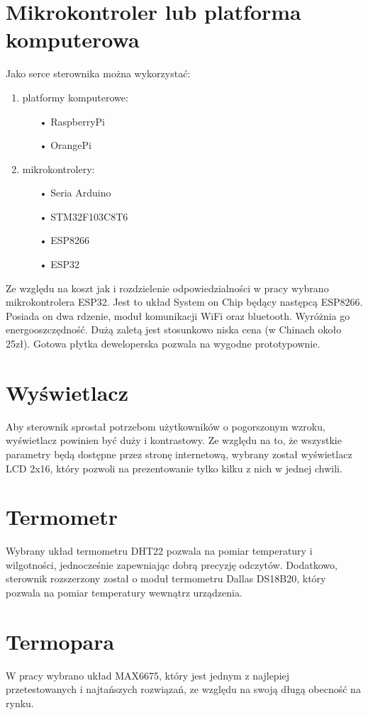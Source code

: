 \documentclass[11pt]{report}
\begin{document}
 \section{Mikrokontroler lub platforma komputerowa}
 Jako serce sterownika można wykorzystać:
 \begin{enumerate}
 \item platformy komputerowe:
 \begin{enumerate}
 \item[•] RaspberryPi
 \item[•] OrangePi
 \end{enumerate}
\item mikrokontrolery:
 \begin{enumerate}
 \item[•] Seria Arduino
 \item[•] STM32F103C8T6
 \item[•] ESP8266
 \item[•] ESP32
 \end{enumerate}
 \end{enumerate}
 Ze względu na koszt jak i rozdzielenie odpowiedzialności w pracy wybrano mikrokontrolera ESP32. Jest to układ System on Chip będący następcą ESP8266. Posiada on dwa rdzenie, moduł komunikacji WiFi oraz bluetooth. Wyróżnia go energooszczędność. Dużą zaletą jest stosunkowo niska cena (w Chinach około 25zł). Gotowa płytka deweloperska pozwala na wygodne prototypownie.
 
 \section{Wyświetlacz}
 Aby sterownik sprostał potrzebom użytkowników o pogorszonym wzroku, wyświetlacz powinien być duży i kontrastowy.
 Ze względu na to, że wszystkie parametry będą dostępne przez stronę internetową, wybrany został wyświetlacz LCD 2x16, który pozwoli na prezentowanie tylko kilku z nich w jednej chwili.
 
 \section{Termometr}
 Wybrany układ termometru DHT22 pozwala na pomiar temperatury i wilgotności, jednocześnie zapewniając dobrą precyzję odczytów. Dodatkowo, sterownik rozszerzony został o moduł termometru Dallas DS18B20, który pozwala na pomiar temperatury wewnątrz urządzenia.
 
 \section{Termopara}
 W pracy wybrano układ MAX6675, który jest jednym z najlepiej przetestowanych i najtańszych rozwiązań, ze względu na swoją długą obecność na rynku.
 
\end{document}
